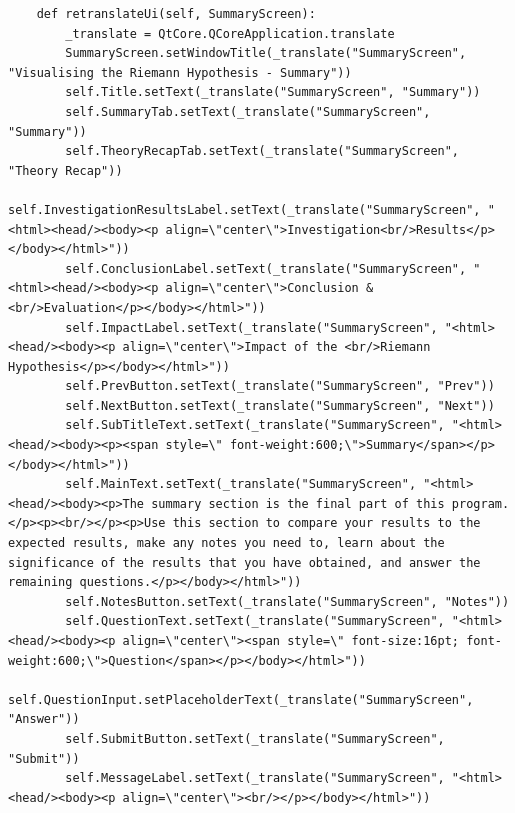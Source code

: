 \documentclass[12pt]{article}
\begin{document}
\begin{lstlisting}
    def retranslateUi(self, SummaryScreen):
        _translate = QtCore.QCoreApplication.translate
        SummaryScreen.setWindowTitle(_translate("SummaryScreen", "Visualising the Riemann Hypothesis - Summary"))
        self.Title.setText(_translate("SummaryScreen", "Summary"))
        self.SummaryTab.setText(_translate("SummaryScreen", "Summary"))
        self.TheoryRecapTab.setText(_translate("SummaryScreen", "Theory Recap"))
        self.InvestigationResultsLabel.setText(_translate("SummaryScreen", "<html><head/><body><p align=\"center\">Investigation<br/>Results</p></body></html>"))
        self.ConclusionLabel.setText(_translate("SummaryScreen", "<html><head/><body><p align=\"center\">Conclusion & <br/>Evaluation</p></body></html>"))
        self.ImpactLabel.setText(_translate("SummaryScreen", "<html><head/><body><p align=\"center\">Impact of the <br/>Riemann Hypothesis</p></body></html>"))
        self.PrevButton.setText(_translate("SummaryScreen", "Prev"))
        self.NextButton.setText(_translate("SummaryScreen", "Next"))
        self.SubTitleText.setText(_translate("SummaryScreen", "<html><head/><body><p><span style=\" font-weight:600;\">Summary</span></p></body></html>"))
        self.MainText.setText(_translate("SummaryScreen", "<html><head/><body><p>The summary section is the final part of this program.</p><p><br/></p><p>Use this section to compare your results to the expected results, make any notes you need to, learn about the significance of the results that you have obtained, and answer the remaining questions.</p></body></html>"))
        self.NotesButton.setText(_translate("SummaryScreen", "Notes"))
        self.QuestionText.setText(_translate("SummaryScreen", "<html><head/><body><p align=\"center\"><span style=\" font-size:16pt; font-weight:600;\">Question</span></p></body></html>"))
        self.QuestionInput.setPlaceholderText(_translate("SummaryScreen", "Answer"))
        self.SubmitButton.setText(_translate("SummaryScreen", "Submit"))
        self.MessageLabel.setText(_translate("SummaryScreen", "<html><head/><body><p align=\"center\"><br/></p></body></html>"))
\end{lstlisting}
\end{document}
